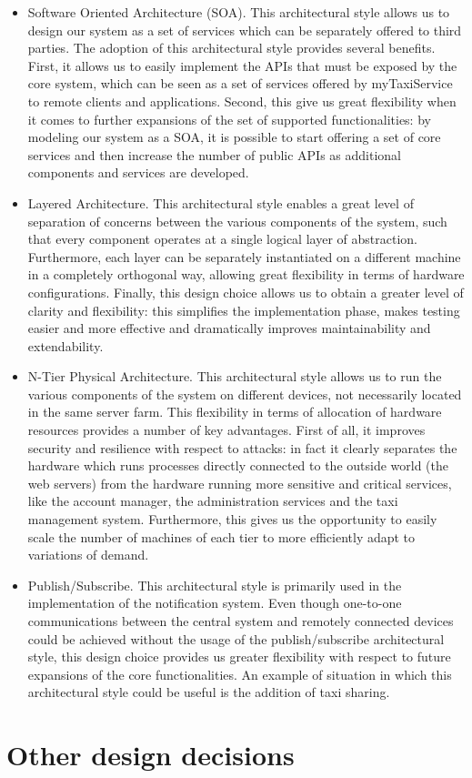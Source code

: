 \begin{itemize}
	\item Software Oriented Architecture (SOA). This architectural style allows us to design our system as a set of services which can be separately offered to third parties. The adoption of this architectural style provides several benefits. First, it allows us to easily implement the APIs that must be exposed by the core system, which can be seen as a set of services offered by myTaxiService to remote clients and applications. Second, this give us great flexibility when it comes to further expansions of the set of supported functionalities: by modeling our system as a SOA, it is possible to start offering a set of core services and then increase the number of public APIs as additional components and services are developed. 
	\item Layered Architecture. This architectural style enables a great level of separation of concerns between the various components of the system, such that every component operates at a single logical layer of abstraction. Furthermore, each layer can be separately instantiated on a different machine in a completely orthogonal way, allowing great flexibility in terms of hardware configurations. Finally, this design choice allows us to obtain a greater level of clarity and flexibility: this simplifies the implementation phase, makes testing easier and more effective and dramatically improves maintainability and extendability.
	\item N-Tier Physical Architecture. This architectural style allows us to run the various components of the system on different devices, not necessarily located in the same server farm. This flexibility in terms of allocation of hardware resources provides a number of key advantages. First of all, it improves security and resilience with respect to attacks: in fact it clearly separates the hardware which runs processes directly connected to the outside world (the web servers) from the hardware running more sensitive and critical services, like the account manager, the administration services and the taxi management system. Furthermore, this gives us the opportunity to easily scale the number of machines of each tier to more efficiently adapt to variations of demand. 
	\item Publish/Subscribe. This architectural style is primarily used in the implementation of the notification system. Even though one-to-one communications between the central system and remotely connected devices could be achieved without the usage of the publish/subscribe architectural style, this design choice provides us greater flexibility with respect to future expansions of the core functionalities. An example of situation in which this architectural style could be useful is the addition of taxi sharing.
\end{itemize}

\section{Other design decisions}